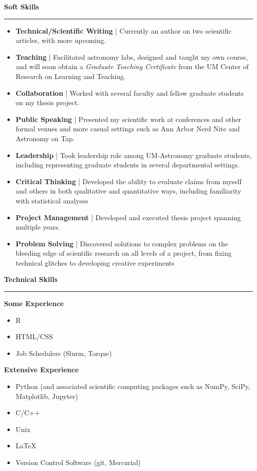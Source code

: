 \documentclass[10pt]{article}
\newcommand{\header}[1]{\vspace{2em}\par \textbf{\large #1}\strut\hrule\vspace{0em}}
\newcommand{\actionHeader}[2]{\textbf{#1 \hfill #2}}
\begin{document}
\header{Soft Skills}
\begin{itemize}
    \item {\bf Technical/Scientific Writing} | Currently an author on two scientific articles, with more upcoming.
    \item {\bf Teaching} | Facilitated astronomy labs, designed and taught my own course, and will soon obtain a {\it Graduate Teaching Certificate} from the UM Center of Research on Learning and Teaching. 
    \item {\bf Collaboration} | Worked with several faculty and fellow graduate students on my thesis project.
    \item {\bf Public Speaking} | Presented my scientific work at conferences and other formal venues and more casual settings such as Ann Arbor Nerd Nite and Astronomy on Tap.
    \item {\bf Leadership} | Took leadership role among UM-Astronomy graduate students, including representing graduate students in several departmental settings.
    \item {\bf Critical Thinking} | Developed the ability to evaluate claims from myself and others in both qualitative and quantitative ways, including familiarity with statistical analyses
    \item {\bf Project Management} | Developed and executed thesis project spanning multiple years. 
    \item {\bf Problem Solving} | Discovered solutions to complex problems on the bleeding edge of scientific research on all levels of a project, from fixing technical glitches to developing creative experiments
\end{itemize}

\header{Technical Skills}
\actionHeader{Some Experience}{}
\vspace{-0.6em}
\begin{itemize}
    \item R
    \item HTML/CSS
    \item Job Schedulers (Slurm, Torque)
\end{itemize}

\actionHeader{Extensive Experience}{}
\vspace{-0.6em}
\begin{itemize}
    \item Python (and associated scientific computing packages such as NumPy, SciPy, Matplotlib, Jupyter)
    \item C/C++
    \item Unix
    \item LaTeX
    \item Version Control Software (git, Mercurial)
\end{itemize}
\end{document}
